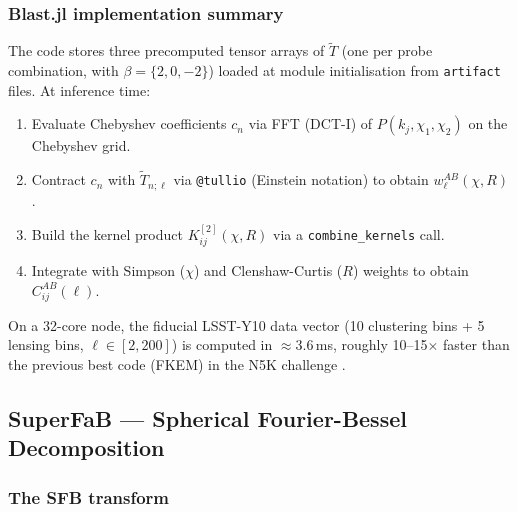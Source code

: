 \subsubsection{Blast.jl implementation summary}

The code stores three precomputed tensor arrays of $\tilde{T}$ (one
per probe combination, with $\beta=\{2,0,-2\}$) loaded at module
initialisation from \texttt{artifact} files. At inference time:
\begin{enumerate}
    \item Evaluate Chebyshev coefficients $c_n$ via FFT (DCT-I) of
          $P(k_j,\chi_1,\chi_2)$ on the Chebyshev grid.
    \item Contract $c_n$ with $\tilde{T}_{n;\ell}$ via \texttt{@tullio}
          (Einstein notation) to obtain $w_\ell^{AB}(\chi,R)$.
    \item Build the kernel product $K^{[2]}_{ij}(\chi,R)$ via a
          \texttt{combine\_kernels} call.
    \item Integrate with Simpson ($\chi$) and Clenshaw-Curtis ($R$)
          weights to obtain $C_{ij}^{AB}(\ell)$.
\end{enumerate}
On a 32-core node, the fiducial LSST-Y10 data vector (10 clustering
bins + 5 lensing bins, $\ell\in[2,200]$) is computed in $\approx 3.6$\,ms,
roughly 10--15$\times$ faster than the previous best code (FKEM) in the
N5K challenge \cite{leonard2023n5k}.

\subsection{SuperFaB --- Spherical Fourier-Bessel Decomposition}

\subsubsection{The SFB transform}

